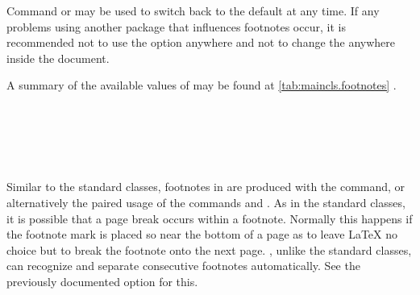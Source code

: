 Command  or  may be used to switch back
to the default  at any time. If 
any problems using another package that influences footnotes occur, it is
recommended not to use the option anywhere and not to change the
 anywhere inside the document.

A summary of the available  values of  may
be found at \autoref{tab:maincls.footnotes}%
%
.%
%
%


\begin{Declaration}
  \\
  \\
  \\
  \\
\end{Declaration}%
%
%
%
%
%
Similar to the standard classes, footnotes in {\KOMAScript} are produced
with the  command, or alternatively the paired usage of the
commands  and .  As in the standard
classes, it is possible that a page break occurs within a footnote. Normally
this happens if the footnote mark is placed so near the bottom of a page as to
leave {\LaTeX} no choice but to break the footnote onto the next page.
\KOMAScript{}, unlike the standard classes,
can recognize and separate consecutive footnotes
automatically. See the previously documented
option  for this.


